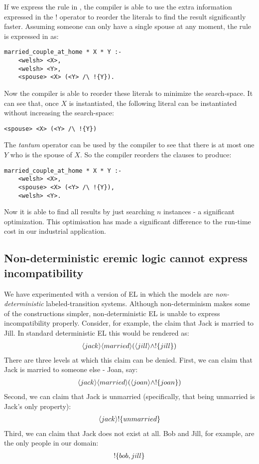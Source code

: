 If we express the rule in \ELFULL{}, the compiler is able to use the extra information expressed in the $!$ operator to reorder the literals to find the result significantly faster.
Assuming someone can only have a single spouse at any moment, the rule is expressed in \ELFULL{} as:
\begin{verbatim}
married_couple_at_home * X * Y :-
    <welsh> <X>,
    <welsh> <Y>,
    <spouse> <X> (<Y> /\ !{Y}).
\end{verbatim}	
Now the compiler is able to reorder these literals to minimize the search-space. 
It can see that, once $X$ is instantiated, the following literal can be instantiated without increasing the search-space:
\begin{verbatim}
<spouse> <X> (<Y> /\ !{Y})
\end{verbatim}
The \emph{tantum} operator can be used by the compiler to see that there is at most one $Y$ who is the spouse of $X$.
So the compiler reorders the clauses to produce:
\begin{verbatim}
married_couple_at_home * X * Y :-
    <welsh> <X>,
    <spouse> <X> (<Y> /\ !{Y}),
    <welsh> <Y>.
\end{verbatim}	
Now it is able to find all results by just searching $n$ instances - a significant optimization.
This optimisation has made a significant difference to the run-time cost in our industrial application.


\subsection{Non-deterministic eremic logic cannot express incompatibility}

We have experimented with a version of EL in which the models are
\emph{non-deterministic} labeled-transition systems.  Although
non-determinism makes some of the constructions simpler,
non-deterministic EL is unable to express incompatibility properly.
Consider, for example, the claim that Jack is married to Jill. 
In standard deterministic EL this would be rendered as:
\begin{eqnarray*}
\langle jack \rangle \langle married \rangle (\langle jill \rangle \land ! \{jill\})
\end{eqnarray*}
There are three levels at which this claim can be denied.
First, we can claim that Jack is married to someone else - Joan, say:
\begin{eqnarray*}
\langle jack \rangle \langle married \rangle (\langle joan \rangle \land ! \{joan\})
\end{eqnarray*}
Second, we can claim that Jack is unmarried (specifically, that being unmarried is Jack's only property):
\begin{eqnarray*}
\langle jack \rangle !\{unmarried\}
\end{eqnarray*}
Third, we can claim that Jack does not exist at all. Bob and Jill, for example, are the only people in our domain:
\begin{eqnarray*}
! \{bob, jill\}
\end{eqnarray*}

